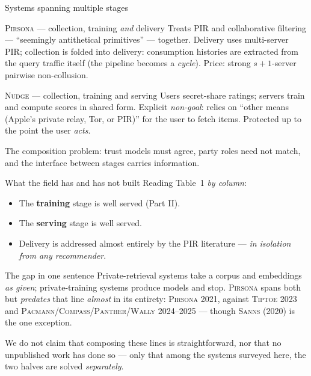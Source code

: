 \documentclass[10pt,aspectratio=169]{beamer}
\newcommand{\sys}[1]{\textsc{#1}\xspace}
\begin{document}
\begin{frame}{Systems spanning multiple stages}
  \begin{block}{\sys{Pirsona} --- collection, training \emph{and} delivery}
    \footnotesize
    Treats PIR and collaborative filtering --- ``seemingly antithetical primitives'' ---
    together. Delivery uses multi-server PIR; \alert{collection is folded into delivery}:
    consumption histories are extracted from the query traffic itself (the pipeline
    becomes a \emph{cycle}). Price: strong $s{+}1$-server pairwise non-collusion.
  \end{block}
 
  \begin{block}{\sys{Nudge} --- collection, training and serving}
    \footnotesize
    Users secret-share ratings; servers train and compute scores in shared form.
    Explicit \emph{non-goal}: relies on ``other means (Apple's private relay, Tor, or PIR)''
    for the user to fetch items. Protected up to the point the user \emph{acts}.
  \end{block}
 
  \begin{center}\scriptsize
  \alert{The composition problem:} trust models must agree, party roles need not match,
  and the interface between stages carries information.
  \end{center}
\end{frame}
 
\begin{frame}{What the field has and has not built}
  Reading Table~1 \emph{by column}:
 
  \begin{itemize}
    \item The \textbf{training} stage is well served (Part II).
    \item The \textbf{serving} stage is well served.
    \item \alert{Delivery} is addressed almost entirely by the PIR literature ---
          \emph{in isolation from any recommender}.
  \end{itemize}
 
  \begin{block}{The gap in one sentence}
    Private-retrieval systems take a corpus and embeddings \emph{as given};
    private-training systems produce models and stop. \sys{Pirsona} spans both but
    \emph{predates} that line \emph{almost} in its entirety: \sys{Pirsona} 2021,
    against \sys{Tiptoe} 2023 and \sys{Pacmann}/\sys{Compass}/\sys{Panther}/\sys{Wally}
    2024--2025 --- though \sys{Sanns} (2020) is the one exception.
  \end{block}
 
  We do not claim that composing these lines is straightforward, nor that no
  unpublished work has done so --- only that among the systems surveyed here,
  the two halves are solved \emph{separately}.
\end{frame}
 
\end{document}
